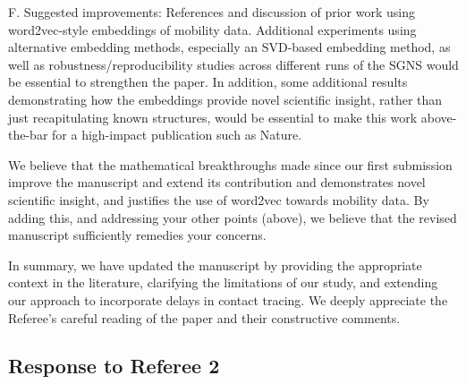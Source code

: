 \documentclass[12pt,a4paper]{article}
\newcommand{\response}[1]{{\noindent #1}}
\newcommand{\rcomment}[1]{%
\vspace{10pt}
\begin{tcolorbox}[colback=black!3,colframe=white!45!black, left=0pt, right=0pt, top=0pt, bottom=0pt, arc=0pt,outer arc=0pt, grow to left by=-0.5cm,grow to right by=-0.5cm]
#1
\end{tcolorbox}
}
\begin{document}
\rcomment{%
F. Suggested improvements:
References and discussion of prior work using word2vec-style embeddings of mobility data.
Additional experiments using alternative embedding methods, especially an SVD-based embedding method, as well as robustness/reproducibility studies across different runs of the SGNS would be essential to strengthen the paper.
In addition, some additional results demonstrating how the embeddings provide novel scientific insight, rather than just recapitulating known structures, would be essential to make this work above-the-bar for a high-impact publication such as Nature.

}


\response{We believe that the mathematical breakthroughs made since our first submission improve the manuscript and extend its contribution and demonstrates novel scientific insight, and justifies the use of word2vec towards mobility data. By adding this, and addressing your other points (above), we believe that the revised manuscript sufficiently remedies your concerns. 

}

\bigskip
\response{In summary, we have updated the manuscript by providing the appropriate context in the literature, clarifying the limitations of our study, and extending our approach to incorporate delays in contact tracing. We deeply appreciate the Referee's careful reading of the paper and their constructive comments. 
}


\subsection{Response to Referee 2}
\end{document}
